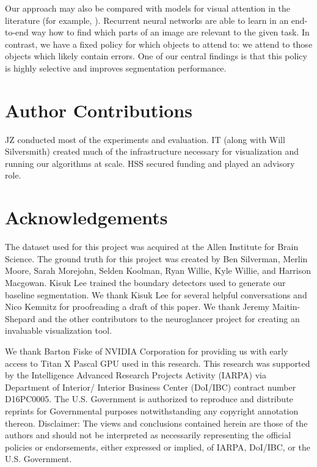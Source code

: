 \documentclass{article}
\begin{document}
Our approach may also be compared with models for visual attention in the literature (for example, \cite{recurrent_attention}). Recurrent neural networks are able to learn in an end-to-end way how to find which parts of an image are relevant to the given task. In contrast, we have a fixed policy for which objects to attend to: we attend to those objects which likely contain errors. One of our central findings is that this policy is highly selective and improves segmentation performance.

\section{Author Contributions}
JZ conducted most of the experiments and evaluation. IT (along with
Will Silversmith) created much of the infrastructure necessary for visualization and running
our algorithms at scale. HSS secured funding and played an advisory role.

\section{Acknowledgements}
The dataset used for this project was acquired at the Allen Institute for Brain Science.
The ground truth for this project was created by Ben Silverman, Merlin Moore, Sarah Morejohn, 
Selden Koolman, Ryan Willie, Kyle Willie, and Harrison Macgowan. Kisuk Lee trained the boundary
detectors used to generate our baseline segmentation. We thank Kisuk Lee for several
helpful conversations and Nico Kemnitz for proofreading a draft of this paper. We thank 
Jeremy Maitin-Shepard and the other contributors to the neuroglancer project for creating an 
invaluable visualization tool.

We thank Barton Fiske of NVIDIA Corporation for providing us with early access to Titan X
Pascal GPU used in this research. This research was supported by the Intelligence Advanced
Research Projects Activity (IARPA) via Department of Interior/ Interior Business Center (DoI/IBC)
contract number D16PC0005. The U.S. Government is authorized to reproduce and distribute reprints
for Governmental purposes notwithstanding any copyright annotation thereon. Disclaimer: The views
and conclusions contained herein are those of the authors and should not be interpreted as necessarily
representing the official policies or endorsements, either expressed or implied, of IARPA, DoI/IBC,
or the U.S. Government.
\end{document}
